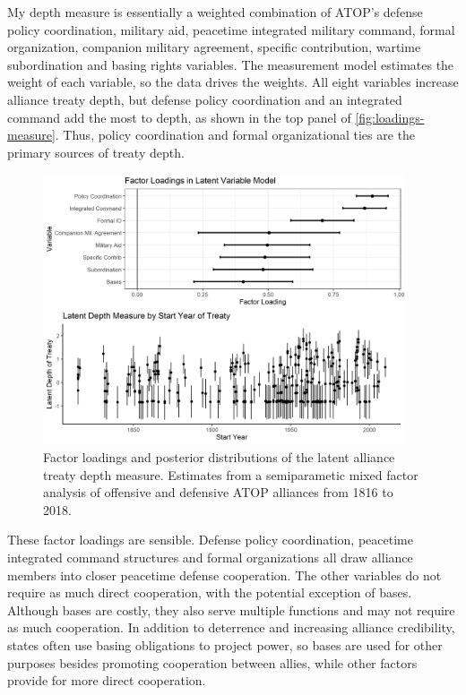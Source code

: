 \documentclass[12pt]{article}
\begin{document}
My depth measure is essentially a weighted combination of ATOP's defense policy coordination, military aid, peacetime integrated military command, formal organization, companion military agreement, specific contribution, wartime subordination and basing rights variables.
The measurement model estimates the weight of each variable, so the data drives the weights.  
All eight variables increase alliance treaty depth, but defense policy coordination and an integrated command add the most to depth, as shown in the top panel of \autoref{fig:loadings-measure}. 
Thus, policy coordination and formal organizational ties are the primary sources of treaty depth. 


\begin{figure}[hbtp]
\centering
\includegraphics[width=0.95\textwidth]{../figures/loadings-measure.png}
\caption{Factor loadings and posterior distributions of the latent alliance treaty depth measure. Estimates from a semiparametic mixed factor analysis of offensive and defensive ATOP alliances from 1816 to 2018.}
\label{fig:loadings-measure}
\end{figure}


These factor loadings are sensible. 
Defense policy coordination, peacetime integrated command structures and formal organizations all draw alliance members into closer peacetime defense cooperation. 
The other variables do not require as much direct cooperation, with the potential exception of bases.
Although bases are costly, they also serve multiple functions and may not require as much cooperation. 
In addition to deterrence and increasing alliance credibility, states often use basing obligations to project power, so bases are used for other purposes besides promoting cooperation between allies, while other factors provide for more direct cooperation.  
\end{document}
